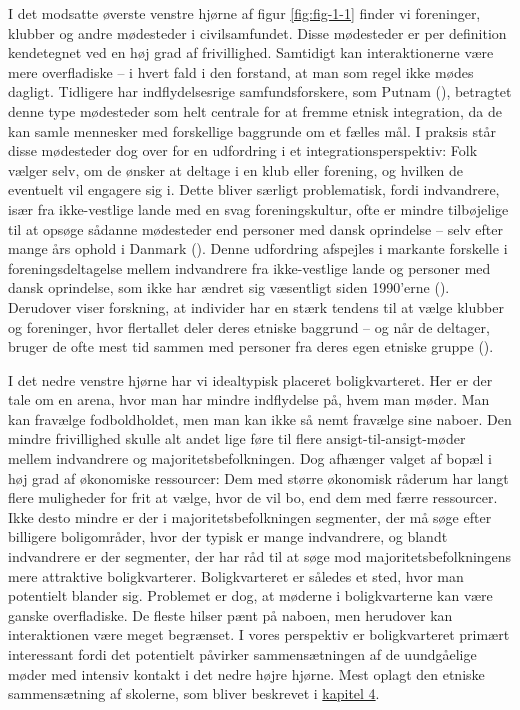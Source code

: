 \documentclass[
]{book}
\begin{document}
I det modsatte øverste venstre hjørne af figur \ref{fig:fig-1-1} finder vi foreninger, klubber og andre mødesteder i civilsamfundet. Disse mødesteder er per definition kendetegnet ved en høj grad af frivillighed. Samtidigt kan interaktionerne være mere overfladiske -- i hvert fald i den forstand, at man som regel ikke mødes dagligt. Tidligere har indflydelsesrige samfundsforskere, som Putnam (), betragtet denne type mødesteder som helt centrale for at fremme etnisk integration, da de kan samle mennesker med forskellige baggrunde om et fælles mål. I praksis står disse mødesteder dog over for en udfordring i et integrationsperspektiv: Folk vælger selv, om de ønsker at deltage i en klub eller forening, og hvilken de eventuelt vil engagere sig i. Dette bliver særligt problematisk, fordi indvandrere, især fra ikke-vestlige lande med en svag foreningskultur, ofte er mindre tilbøjelige til at opsøge sådanne mødesteder end personer med dansk oprindelse -- selv efter mange års ophold i Danmark (). Denne udfordring afspejles i markante forskelle i foreningsdeltagelse mellem indvandrere fra ikke-vestlige lande og personer med dansk oprindelse, som ikke har ændret sig væsentligt siden 1990'erne (). Derudover viser forskning, at individer har en stærk tendens til at vælge klubber og foreninger, hvor flertallet deler deres etniske baggrund -- og når de deltager, bruger de ofte mest tid sammen med personer fra deres egen etniske gruppe ().

I det nedre venstre hjørne har vi idealtypisk placeret boligkvarteret. Her er der tale om en arena, hvor man har mindre indflydelse på, hvem man møder. Man kan fravælge fodboldholdet, men man kan ikke så nemt fravælge sine naboer. Den mindre frivillighed skulle alt andet lige føre til flere ansigt-til-ansigt-møder mellem indvandrere og majoritetsbefolkningen. Dog afhænger valget af bopæl i høj grad af økonomiske ressourcer: Dem med større økonomisk råderum har langt flere muligheder for frit at vælge, hvor de vil bo, end dem med færre ressourcer. Ikke desto mindre er der i majoritetsbefolkningen segmenter, der må søge efter billigere boligområder, hvor der typisk er mange indvandrere, og blandt indvandrere er der segmenter, der har råd til at søge mod majoritetsbefolkningens mere attraktive boligkvarterer. Boligkvarteret er således et sted, hvor man potentielt blander sig. Problemet er dog, at møderne i boligkvarterne kan være ganske overfladiske. De fleste hilser pænt på naboen, men herudover kan interaktionen være meget begrænset. I vores perspektiv er boligkvarteret primært interessant fordi det potentielt påvirker sammensætningen af de uundgåelige møder med intensiv kontakt i det nedre højre hjørne. Mest oplagt den etniske sammensætning af skolerne, som bliver beskrevet i \hyperref[kap4]{kapitel 4}.
\end{document}
